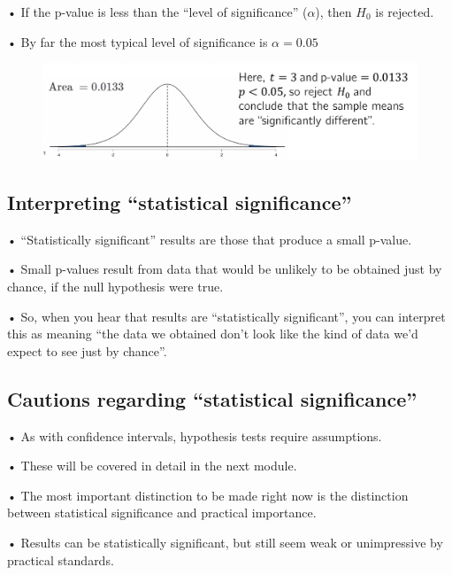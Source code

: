 \documentclass[
  letterpaper,
  DIV=11,
  numbers=noendperiod]{scrreprt}
\begin{document}
• If the p-value is less than the ``level of significance''
(\(\alpha\)), then \(H_0\) is rejected.

• By far the most typical level of significance is \(\alpha = 0.05\)

\begin{figure}

{\centering \includegraphics{images/mod1_12.png}

}

\end{figure}

\hypertarget{interpreting-statistical-significance}{%
\subsection{Interpreting ``statistical
significance''}\label{interpreting-statistical-significance}}

• ``Statistically significant'' results are those that produce a small
p-value.

• Small p-values result from data that would be unlikely to be obtained
just by chance, if the null hypothesis were true.

• So, when you hear that results are ``statistically significant'', you
can interpret this as meaning ``the data we obtained don't look like the
kind of data we'd expect to see just by chance''.

\hypertarget{cautions-regarding-statistical-significance}{%
\subsection{Cautions regarding ``statistical
significance''}\label{cautions-regarding-statistical-significance}}

• As with confidence intervals, hypothesis tests require assumptions.

• These will be covered in detail in the next module.

• The most important distinction to be made right now is the distinction
between statistical significance and practical importance.

• Results can be statistically significant, but still seem weak or
unimpressive by practical standards.
\end{document}
